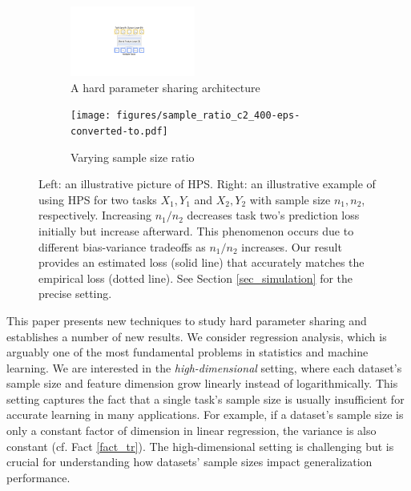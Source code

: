 \begin{figure}[!t]
	\begin{subfigure}[t]{0.5\textwidth}
		\centering
		\includegraphics[width=0.45\textwidth,valign=t]{figures/mtl_model_arch.pdf}
		\caption{A hard parameter sharing architecture}
		\label{fig_intro_arch}
	\end{subfigure}\hfill
	\begin{subfigure}[t]{0.5\textwidth}
		\centering
		\texttt{[image: figures/sample\_ratio\_c2\_400-eps-converted-to.pdf]}
		\caption{Varying sample size ratio}
		\label{fig_intro_sample_size_b}
	\end{subfigure}
	\vspace{-0.1in}
	\caption{
	Left: an illustrative picture of HPS.
	Right: an illustrative example of using HPS for two tasks $X_1, Y_1$ and $X_2, Y_2$ with sample size $n_1, n_2$, respectively.
	Increasing $n_1/n_2$ decreases task two's prediction loss initially but increase afterward. This phenomenon occurs due to different bias-variance tradeoffs as $n_1/n_2$ increases. Our result provides an estimated loss (solid line) that accurately matches the empirical loss (dotted line).
	See Section \ref{sec_simulation} for the precise setting.}
	\label{fig_intro_sample_size}
\end{figure}



This paper presents new techniques to study hard parameter sharing and establishes a number of new results.
We consider regression analysis, which is arguably one of the most fundamental problems in statistics and machine learning.
We are interested in the \textit{high-dimensional} setting, where each dataset's sample size and feature dimension grow linearly instead of logarithmically.
This setting captures the fact that a single task's sample size is usually insufficient for accurate learning in many applications.
For example, if a dataset's sample size is only a constant factor of dimension in linear regression, the variance is also constant (cf. Fact \ref{fact_tr}).
The high-dimensional setting is challenging but is crucial for understanding how datasets' sample sizes impact generalization performance.
